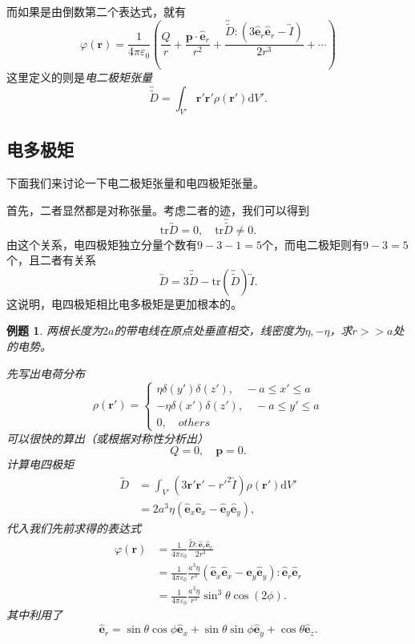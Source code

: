 \documentclass[UTF8]{ctexbook}
\renewcommand{\d}{\mathrm{d}}
\renewcommand{\b}{\boldsymbol}
\renewcommand{\t}{\overleftrightarrow}
\renewcommand{\k}{\frac{1}{4\pi\varepsilon_0}}
\newtheorem{eg}{例题}
\numberwithin{equation}{chapter}
\begin{document}
	而如果是由倒数第二个表达式，就有
	\[\varphi(\b{r})=\k \left( \frac{Q}{r} +\frac{\b{p}\cdot\hat{\b{e}}_r}{r^2}+\frac{\t{\tilde{D}}:(3\hat{\b{e}}_r\hat{\b{e}}_r-\t{I})}{2r^3}+\cdots\right)\]
	这里定义的则是\emph{电二极矩张量}
	\[\t{\tilde{D}}=\int_{V'}\b{r}'\b{r}'\rho(\b{r}')\d V'.\]
	
	\subsection{电多极矩}
	下面我们来讨论一下电二极矩张量和电四极矩张量。
	
	首先，二者显然都是对称张量。考虑二者的迹，我们可以得到
	\[\mathrm{tr}\t{D}=0,\quad \mathrm{tr}\t{\tilde{D}}\neq0.\]
	由这个关系，电四极矩独立分量个数有$9-3-1=5$个，而电二极矩则有$9-3=5$个，且二者有关系
	\[\t{D}=3\t{\tilde{D}}-\mathrm{tr}(\t{\tilde{D}})\t{I}.\]
	这说明，电四极矩相比电多极矩是更加根本的。
	
	\begin{eg}
		两根长度为$2a$的带电线在原点处垂直相交，线密度为$\eta,-\eta$，求$r>>a$处的电势。
		
		先写出电荷分布
		\[\rho(\b{r}')=\left\{\begin{gathered} \eta \delta(y')\delta(z') ,\quad -a\leq x' \leq a \\ -\eta\delta(x')\delta(z'),\quad -a\leq y'\leq a \\ 0,\quad others\end{gathered}\right.\]
		可以很快的算出（或根据对称性分析出）
		\[Q=0,\quad \b{p}=0.\]
		计算电四极矩
		\begin{align*}
			\t{D}&=\int_{V'} (3\b{r}'\b{r}'-r'^2\t{I})\rho(\b{r}')\d V' \\
			&=2a^3\eta(\hat{\b{e}}_x\hat{\b{e}}_x-\hat{\b{e}}_y\hat{\b{e}}_y),
		\end{align*}
		代入我们先前求得的表达式
		\begin{align*}
			\varphi(\b{r})&=\k \frac{\t{D}:\hat{\b{e}}_r\hat{\b{e}}_r}{2r^3} \\
			&=\k \frac{a^3\eta}{r^3}(\hat{\b{e}}_x\hat{\b{e}}_x-\hat{\b{e}}_y\hat{\b{e}}_y):\hat{\b{e}}_r\hat{\b{e}}_r \\
			&=\k \frac{a^3\eta}{r^3}\sin^3\theta\cos(2\phi).
		\end{align*}
		其中利用了
		\[\hat{\b{e}}_r=\sin\theta\cos\phi\hat{\b{e}}_x+\sin\theta\sin\phi\hat{\b{e}}_y+\cos\theta\hat{\b{e}}_z.\]
	\end{eg}
	
	
\end{document}
